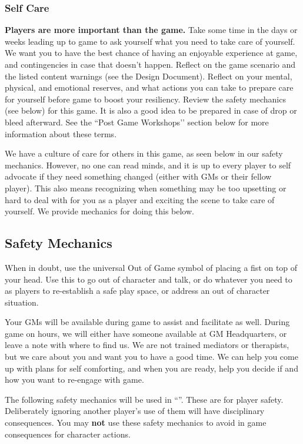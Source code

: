 \documentclass[sheet]{GL2020}
\begin{document}
\subsubsection{Self Care}
\textbf{Players are more important than the game.} Take some time in the days or weeks leading up to game to ask yourself what you need to take care of yourself. We want you to have the best chance of having an enjoyable experience at game, and contingencies in case that doesn't happen. Reflect on the game scenario and the listed content warnings (see the Design Document). Reflect on your mental, physical, and emotional reserves, and what actions you can take to prepare care for yourself before game to boost your resiliency. Review the safety mechanics (see below) for this game. It is also a good idea to be prepared in case of drop or bleed afterward. See the ``Post Game Workshops'’ section below for more information about these terms.

We have a culture of care for others in this game, as seen below in our safety mechanics. However, no one can read minds, and it is up to every player to self advocate if they need something changed (either with GMs or their fellow player). This also means recognizing when something may be too upsetting or hard to deal with for you as a player and exciting the scene to take care of yourself. We provide mechanics for doing this below. 

\subsection{Safety Mechanics}
When in doubt, use the universal Out of Game symbol of placing a fist on top of your head. Use this to go out of character and talk, or do whatever you need to as players to re-establish a safe play space, or address an out of character situation. 

Your GMs will be available during game to assist and facilitate as well. During game on hours, we will either have someone available at GM Headquarters, or leave a note with where to find us. We are not trained mediators or therapists, but we care about you and want you to have a good time. We can help you come up with plans for self comforting, and when you are ready, help you decide if and how you want to re-engage with game.

The following safety mechanics will be used in ``\gamename{}''. These are for player safety. Deliberately ignoring another player's use of them will have disciplinary consequences. You may \textbf{not} use these safety mechanics to avoid in game consequences for character actions.
\end{document}
